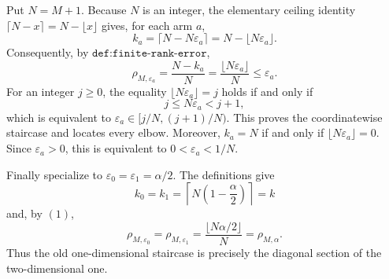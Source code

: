 Put \(N=M+1\). Because \(N\) is an integer, the elementary ceiling identity \(\lceil N-x\rceil=N-\lfloor x\rfloor\) gives, for each arm \(a\),
\[
k_a=\lceil N-N\varepsilon_a\rceil=N-\lfloor N\varepsilon_a\rfloor.
\]
Consequently, by \(\texttt{def:finite-rank-error}\),
\[
\rho_{M,\varepsilon_a}=\frac{N-k_a}{N}=\frac{\lfloor N\varepsilon_a\rfloor}{N}\le\varepsilon_a.
\tag{1}
\]
For an integer \(j\ge0\), the equality \(\lfloor N\varepsilon_a\rfloor=j\) holds if and only if
\[
j\le N\varepsilon_a<j+1,
\]
which is equivalent to \(\varepsilon_a\in[j/N,(j+1)/N)\). This proves the coordinatewise staircase and locates every elbow. Moreover, \(k_a=N\) if and only if \(\lfloor N\varepsilon_a\rfloor=0\). Since \(\varepsilon_a>0\), this is equivalent to \(0<\varepsilon_a<1/N\).

Finally specialize to \(\varepsilon_0=\varepsilon_1=\alpha/2\). The definitions give
\[
k_0=k_1=\left\lceil N\left(1-\frac\alpha2\right)\right\rceil=k
\]
and, by \((1)\),
\[
\rho_{M,\varepsilon_0}=\rho_{M,\varepsilon_1}=\frac{\lfloor N\alpha/2\rfloor}{N}=\rho_{M,\alpha}.
\]
Thus the old one-dimensional staircase is precisely the diagonal section of the two-dimensional one.